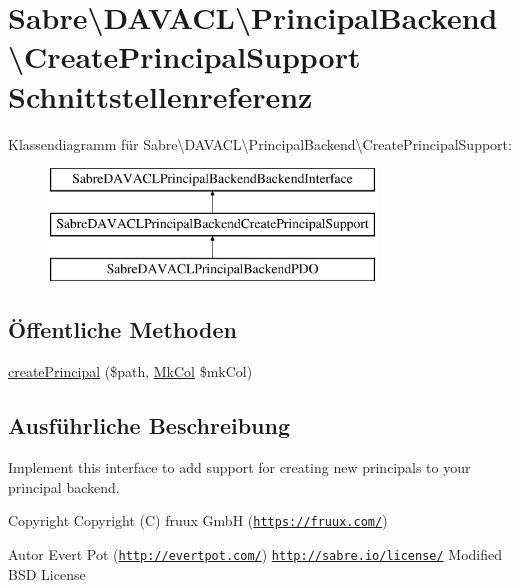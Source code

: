 \hypertarget{interface_sabre_1_1_d_a_v_a_c_l_1_1_principal_backend_1_1_create_principal_support}{}\section{Sabre\textbackslash{}D\+A\+V\+A\+CL\textbackslash{}Principal\+Backend\textbackslash{}Create\+Principal\+Support Schnittstellenreferenz}
\label{interface_sabre_1_1_d_a_v_a_c_l_1_1_principal_backend_1_1_create_principal_support}
Klassendiagramm für Sabre\textbackslash{}D\+A\+V\+A\+CL\textbackslash{}Principal\+Backend\textbackslash{}Create\+Principal\+Support\+:\begin{figure}[H]
\begin{center}
\leavevmode
\includegraphics[height=3.000000cm]{interface_sabre_1_1_d_a_v_a_c_l_1_1_principal_backend_1_1_create_principal_support}
\end{center}
\end{figure}
\subsection*{Öffentliche Methoden}
\begin{DoxyCompactItemize}
\item 
\mbox{\hyperlink{interface_sabre_1_1_d_a_v_a_c_l_1_1_principal_backend_1_1_create_principal_support_aec4515b66518b61cc03eab775bd4cc82}{create\+Principal}} (\$path, \mbox{\hyperlink{class_sabre_1_1_d_a_v_1_1_mk_col}{Mk\+Col}} \$mk\+Col)
\end{DoxyCompactItemize}


\subsection{Ausführliche Beschreibung}
Implement this interface to add support for creating new principals to your principal backend.

\begin{DoxyCopyright}{Copyright}
Copyright (C) fruux GmbH (\href{https://fruux.com/}{\tt https\+://fruux.\+com/}) 
\end{DoxyCopyright}
\begin{DoxyAuthor}{Autor}
Evert Pot (\href{http://evertpot.com/}{\tt http\+://evertpot.\+com/})  \href{http://sabre.io/license/}{\tt http\+://sabre.\+io/license/} Modified B\+SD License 
\end{DoxyAuthor}


